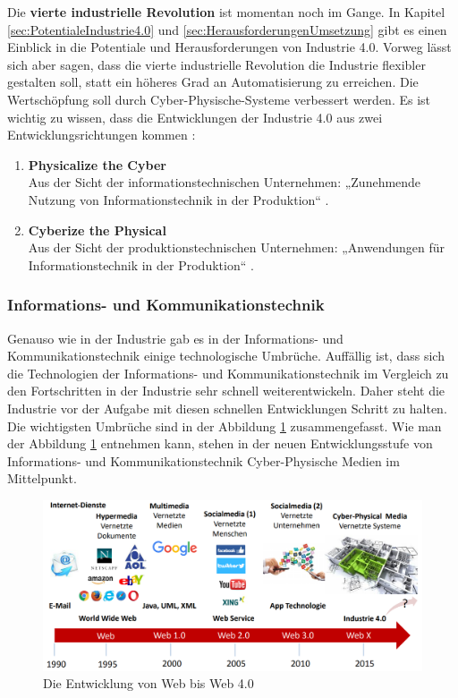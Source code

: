 Die \textbf{vierte industrielle Revolution} ist momentan noch im Gange. In Kapitel \ref{sec:PotentialeIndustrie4.0} und \ref{sec:HerausforderungenUmsetzung} gibt es einen Einblick in die Potentiale und Herausforderungen von Industrie 4.0. Vorweg lässt sich aber sagen, dass die vierte industrielle Revolution die Industrie flexibler gestalten soll, statt ein höheres Grad an Automatisierung zu erreichen. Die Wertschöpfung soll durch Cyber-Physische-Systeme verbessert werden. Es ist wichtig zu wissen, dass die Entwicklungen der Industrie 4.0 aus zwei Entwicklungsrichtungen kommen \cite{1}:
\begin{enumerate}
	\item \textbf{Physicalize the Cyber} \\ Aus der Sicht der informationstechnischen Unternehmen: „Zunehmende Nutzung von Informationstechnik in der Produktion“ \cite{1}.
	\item \textbf{Cyberize the Physical} \\ Aus der Sicht der produktionstechnischen Unternehmen: „Anwendungen für Informationstechnik in der Produktion“ \cite{1}.
\end{enumerate}

\subsubsection{Informations- und Kommunikationstechnik}\label{sec:WebRevolution}
Genauso wie in der Industrie gab es in der Informations- und Kommunikationstechnik einige technologische Umbrüche. Auffällig ist, dass sich die Technologien der Informations- und Kommunikationstechnik im Vergleich zu den Fortschritten in der Industrie sehr schnell weiterentwickeln. Daher steht die Industrie vor der Aufgabe mit diesen schnellen Entwicklungen Schritt zu halten. Die wichtigsten Umbrüche sind in der Abbildung \ref{fig:WebRevolutionBild} zusammengefasst. Wie man der Abbildung \ref{fig:WebRevolutionBild} entnehmen kann, stehen in der neuen Entwicklungsstufe von Informations- und Kommunikationstechnik Cyber-Physische Medien im Mittelpunkt.
\begin{figure}[h]
	\centering
	\includegraphics[width=1\linewidth]{Bilder/A2_EntwicklungWeb0-4}
	\caption{Die Entwicklung von Web bis Web 4.0 \cite{A2}}
	\label{fig:WebRevolutionBild}
\end{figure}

